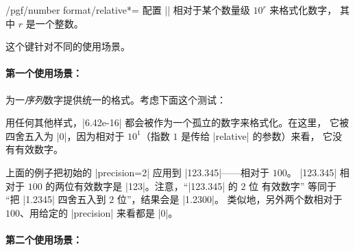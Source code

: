 \documentclass[a4paper,doc2]{ltxdoc}
\begin{document}
\begin{keylist}{/pgf/number format/relative*=}
    配置 |\pgfmathprintnumber| 相对于某个数量级 $10^r$ 来格式化数字，
    其中 $r$ 是一个整数。

    这个键针对不同的使用场景。


    \paragraph{第一个使用场景：}

    为一\emph{序列}数字提供统一的格式。考虑下面这个测试：
\begin{codeexample}[]
\hspace{1em}
\hspace{1em}
\hspace{1em}
\hspace{1em}
\end{codeexample}
    \noindent 用任何其他样式，|6.42e-16| 都会被作为一个孤立的数字来格式化。在这里，
    它被四舍五入为 |0|，因为相对于 $10^1$（指数 $1$ 是传给 |relative| 的参数）来看，
    它没有有效数字。
\begin{codeexample}[]
\hspace{1em}
\hspace{1em}
\hspace{1em}
\end{codeexample}
    \noindent 上面的例子把初始的 |precision=2| 应用到 |123.345|——相对于 $100$。
    |123.345| 相对于 $100$ 的两位有效数字是 |123|。注意，``|123.345| 的 $2$ 位
    有效数字'' 等同于 ``把 |1.2345| 四舍五入到 $2$ 位''，结果会是 |1.2300|。
    类似地，另外两个数相对于 $100$、用给定的 |precision| 来看都是 |0|。
\begin{codeexample}[]
\hspace{1em}
\hspace{1em}
\hspace{1em}
\end{codeexample}

    \paragraph{第二个使用场景：}


\end{keylist}
\end{document}
